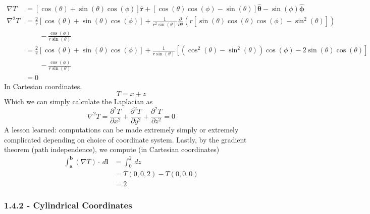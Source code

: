 \documentclass[a4paper]{article}
\begin{document}
\begin{align*}
	\nabla T & = \!\left[ \cos\!\left(\theta\right) + \sin\!\left(\theta\right)\cos\!\left(\phi\right) \right]\pmb{\hat{r}} + \!\left[ \cos\!\left(\theta\right)\cos\!\left(\phi\right) - \sin\!\left(\theta\right) \right]\pmb{\hat{\theta}} - \sin\!\left(\phi\right)\pmb{\hat{\phi}} \\
	\nabla^{2}T & = \frac{2}{r}\!\left[ \cos\!\left(\theta\right) + \sin\!\left(\theta\right)\cos\!\left(\phi\right) \right] + \frac{1}{r^{2}\sin\!\left(\theta\right)}\frac{\partial }{\partial \theta}\!\left( r \!\left[ \sin\!\left(\theta\right)\cos\!\left(\theta\right)\cos\!\left(\phi\right) - \sin^{2}\!\left(\theta\right) \right] \right) \\
		    & \qquad - \frac{\cos\!\left(\phi\right)}{r \sin\!\left(\theta\right)} \\
		    & = \frac{2}{r}\!\left[ \cos\!\left(\theta\right) + \sin\!\left(\theta\right)\cos\!\left(\phi\right) \right] + \frac{1}{r \sin\!\left(\theta\right)}\!\left[ \!\left( \cos^{2}\!\left(\theta\right) - \sin^{2}\!\left(\theta\right) \right)\cos\!\left(\phi\right) - 2 \sin\!\left(\theta\right)\cos\!\left(\theta\right) \right] \\
		    & \qquad - \frac{\cos\!\left(\phi\right)}{r \sin\!\left(\theta\right)} \\
		    & = 0
\end{align*}
In Cartesian coordinates,
\[
	T = x + z 
\]
Which we can simply calculate the Laplacian as 
\[
	\nabla^{2}T = \frac{\partial^2 T}{\partial x^2} + \frac{\partial^2 T}{\partial y^2} + \frac{\partial^2 T}{\partial z^2} = 0 
\]
A lesson learned: computations can be made extremely simply or extremely complicated depending on choice of coordinate system. Lastly, by the gradient theorem (path independence), we compute (in Cartesian coordinates)
\begin{align*}
	\int^{\pmb{b}}_{\pmb{a}} \!\left( \nabla T \right) \cdot \, d \pmb{l} & = \int^{2}_{0}  \, dz \\
									      & = T \!\left( 0,0,2 \right) - T \!\left( 0,0,0 \right) \\
									      & = 2
\end{align*}

\newpage
\subsubsection{\textsf{1.4.2 - Cylindrical Coordinates}}
\end{document}
